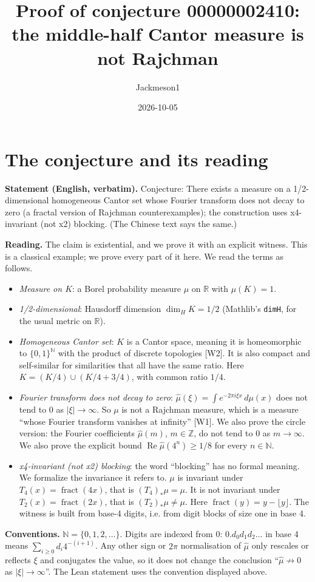 \documentclass[11pt]{article}
\title{Proof of conjecture 00000002410:\\ the middle-half Cantor measure is not Rajchman}
\author{Jackmeson1}
\date{2026-10-05}
\theoremstyle{definition}
\newcommand{\fr}{\operatorname{fract}}
\begin{document}
\maketitle

\section{The conjecture and its reading}

\textbf{Statement (English, verbatim).} Conjecture: There exists a measure on a 1/2-dimensional
homogeneous Cantor set whose Fourier transform does not decay to zero (a fractal version of Rajchman
counterexamples); the construction uses x4-invariant (not x2) blocking. (The Chinese text says the
same.)

\textbf{Reading.} The claim is existential, and we prove it with an explicit witness. This is a
classical example; we prove every part of it here. We read the terms as follows.
\begin{itemize}
\item \emph{Measure on $K$}: a Borel probability measure $\mu$ on $\mathbb{R}$ with $\mu(K)=1$.
\item \emph{1/2-dimensional}: Hausdorff dimension $\dim_H K = 1/2$ (Mathlib's \texttt{dimH}, for the
  usual metric on $\mathbb{R}$).
\item \emph{Homogeneous Cantor set}: $K$ is a Cantor space, meaning it is homeomorphic to
  $\{0,1\}^{\mathbb{N}}$ with the product of discrete topologies [W2]. It is also compact and
  self-similar for similarities that all have the same ratio. Here $K = (K/4)\cup(K/4+3/4)$, with
  common ratio $1/4$.
\item \emph{Fourier transform does not decay to zero}: $\hat\mu(\xi)=\int e^{-2\pi i\xi x}\,d\mu(x)$
  does not tend to $0$ as $|\xi|\to\infty$. So $\mu$ is not a Rajchman measure, which is a measure
  ``whose Fourier transform vanishes at infinity'' [W1]. We also prove the circle version: the
  Fourier coefficients $\hat\mu(m)$, $m\in\mathbb{Z}$, do not tend to $0$ as $m\to\infty$. We also
  prove the explicit bound $\operatorname{Re}\hat\mu(4^n)\ge 1/8$ for every $n\in\mathbb{N}$.
\item \emph{x4-invariant (not x2) blocking}: the word ``blocking'' has no formal meaning. We
  formalize the invariance it refers to. $\mu$ is invariant under $T_4(x)=\fr(4x)$, that is
  $(T_4)_*\mu=\mu$. It is not invariant under $T_2(x)=\fr(2x)$, that is $(T_2)_*\mu\ne\mu$. Here
  $\fr(y)=y-\lfloor y\rfloor$. The witness is built from base-4 digits, i.e. from digit blocks of
  size one in base 4.
\end{itemize}
\textbf{Conventions.} $\mathbb{N}=\{0,1,2,\dots\}$. Digits are indexed from $0$:
$0.d_0d_1d_2\ldots$ in base 4 means $\sum_{i\ge0}d_i4^{-(i+1)}$. Any other sign or $2\pi$
normalisation of $\hat\mu$ only rescales or reflects $\xi$ and conjugates the value, so it does not
change the conclusion ``$\hat\mu\not\to0$ as $|\xi|\to\infty$''. The Lean statement uses the
convention displayed above.
\end{document}
